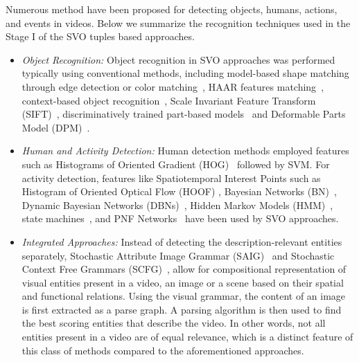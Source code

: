 \documentclass[10pt,journal,compsoc]{IEEEtran}
\begin{document}
Numerous method have been proposed for detecting objects, humans, actions, and events in videos. Below we summarize the recognition techniques used in the Stage I of the SVO tuples based approaches.

\begin{itemize}

\item \textit{Object Recognition:} Object recognition in SVO approaches was performed typically using conventional methods, including model-based shape matching through edge detection or color matching~\cite{kojima2002natural}, HAAR features matching~\cite{viola2001rapid}, context-based object recognition~\cite{torralba2003context}, Scale Invariant Feature Transform (SIFT)~\cite{lowe1999object}, discriminatively trained part-based models~\cite{felzenszwalb2010a} and Deformable Parts Model (DPM)~\cite{felzenszwalb2008, felzenszwalb2010b}. 

\item \textit{Human and Activity Detection: } Human detection methods employed features such as Histograms of Oriented Gradient (HOG)~\cite{dalal2005histograms} followed by SVM. For activity detection, features like Spatiotemporal Interest Points such as Histogram of Oriented Optical Flow (HOOF) \cite{hoof}, Bayesian Networks (BN)~\cite{hongeng2000bayesian}, Dynamic Bayesian Networks (DBNs)~\cite{gong2003recognition}, Hidden Markov Models (HMM)~\cite{bobick1997state}, state machines~\cite{koller1991algorithmic}, and PNF Networks~\cite{pinhanez1998human} have been used by SVO approaches. 

\item \textit{Integrated Approaches:} Instead of detecting the description-relevant entities separately, Stochastic Attribute Image Grammar (SAIG)~\cite{zhu2007stochastic} and Stochastic Context Free Grammars (SCFG)~\cite{moore2002recognizing}, allow for compositional representation of visual entities present in a video, an image or a scene based on their spatial and functional relations. Using the visual grammar, the content of an image is first extracted as a parse graph. A parsing algorithm is then used to find the best scoring entities that describe the video. In other words, not all entities present in a video are of equal relevance, which is a distinct feature of this class of methods compared to the aforementioned approaches.
\end{itemize}
\end{document}
